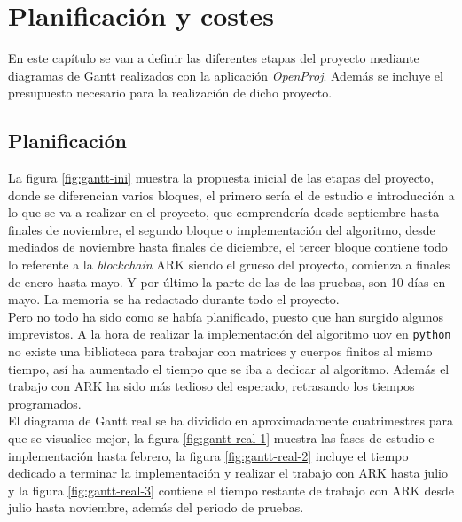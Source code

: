 \chapter{Planificación y costes}


En este capítulo se van a definir las diferentes etapas del proyecto mediante diagramas de Gantt realizados con la aplicación \textit{OpenProj}. Además se incluye el presupuesto necesario para la realización de dicho proyecto.

\section{Planificación}

La figura \ref{fig:gantt-ini} muestra la propuesta inicial de las etapas del proyecto, donde se diferencian varios bloques, el primero sería el de estudio e introducción a lo que se va a realizar en el proyecto, que comprendería desde septiembre hasta finales de noviembre, el segundo bloque o implementación del algoritmo, desde mediados de noviembre hasta finales de diciembre, el tercer bloque contiene todo lo referente a la \textit{blockchain} ARK siendo el grueso del proyecto, comienza a finales de enero hasta mayo. Y por último la parte de las de las pruebas, son 10 días en mayo. La memoria se ha redactado durante todo el proyecto.\\

Pero no todo ha sido como se había planificado, puesto que han surgido algunos imprevistos. A la hora de realizar la implementación del algoritmo \acrshort{uov} en \texttt{python} no existe una biblioteca para trabajar con matrices y cuerpos finitos al mismo tiempo, así ha aumentado el tiempo que se iba a dedicar al algoritmo. Además el trabajo con ARK ha sido más tedioso del esperado, retrasando los tiempos programados.\\

El diagrama de Gantt real se ha dividido en aproximadamente cuatrimestres para que se visualice mejor, la figura \ref{fig:gantt-real-1} muestra las fases de estudio e implementación hasta febrero, la figura \ref{fig:gantt-real-2} incluye el tiempo dedicado a terminar la implementación y realizar el trabajo con ARK hasta julio y la figura \ref{fig:gantt-real-3} contiene el tiempo restante de trabajo con ARK desde julio hasta noviembre, además del periodo de pruebas.\\


